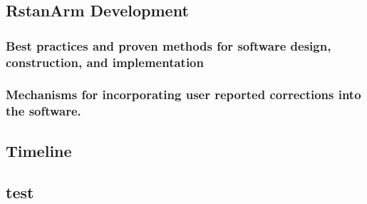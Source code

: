 \documentclass[11pt,notitlepage]{article}
\begin{document}
\subsection*{RstanArm Development}

\subsubsection*{Best practices and proven methods for software design, construction, and implementation}
\subsubsection*{Mechanisms for incorporating user reported corrections into the software.}

\subsection*{Timeline}




\begin{table}[]
\caption{Timeline: The above timeline outlines our targets and milestones over the five year grant period.}
\label{Timeline}
\end{table}

\subsection*{test}
\end{document}
